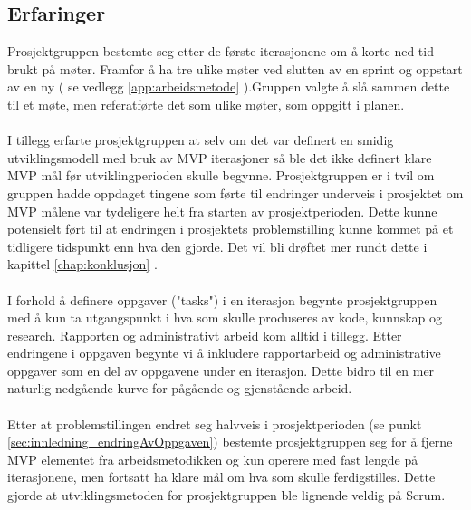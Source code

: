 \subsection{Erfaringer}
\label{sec:innledning_prosjekgruppensValgteArbeidsform_erfaringer}
Prosjektgruppen bestemte seg etter de første iterasjonene om å korte ned tid brukt på møter. Framfor å ha tre ulike møter ved slutten av en sprint og oppstart av en ny ( se vedlegg \ref{app:arbeidsmetode} ).Gruppen valgte å slå sammen dette til et møte, men referatførte det som ulike møter, som oppgitt i planen. 
\\
\\
I tillegg erfarte prosjektgruppen at selv om det var definert en smidig utviklingsmodell med bruk av MVP iterasjoner så ble det ikke definert klare MVP mål før utviklingperioden skulle begynne. Prosjektgruppen er i tvil om gruppen hadde oppdaget tingene som førte til endringer underveis i prosjektet om MVP målene var tydeligere helt fra starten av prosjektperioden. Dette kunne potensielt ført til at endringen i prosjektets problemstilling kunne kommet på et tidligere tidspunkt enn hva den gjorde. Det vil bli drøftet mer rundt dette i kapittel \ref{chap:konklusjon} .
\\
\\
I forhold å definere oppgaver ("tasks") i en iterasjon begynte prosjektgruppen med å kun ta utgangspunkt i hva som skulle produseres av kode, kunnskap og research. Rapporten og administrativt arbeid kom alltid i tillegg. Etter endringene i oppgaven begynte vi å inkludere rapportarbeid og administrative oppgaver som en del av oppgavene under en iterasjon. Dette bidro til en mer naturlig nedgående kurve for pågående og gjenstående arbeid.
\\
\\
Etter at problemstillingen endret seg halvveis i prosjektperioden (se punkt \ref{sec:innledning_endringAvOppgaven}) bestemte prosjektgruppen seg for å fjerne MVP elementet fra arbeidsmetodikken og kun operere med fast lengde på iterasjonene, men fortsatt ha klare mål om hva som skulle ferdigstilles. Dette gjorde at utviklingsmetoden for prosjektgruppen ble lignende veldig på Scrum.

